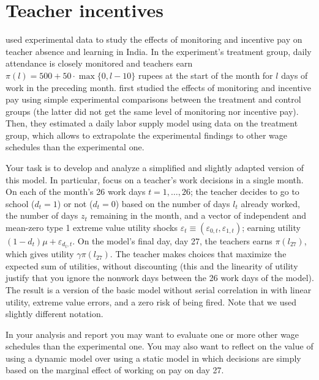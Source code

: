 \documentclass[fleqn,12pt]{article}
\theoremstyle{plain}
\theoremstyle{definition}
\begin{document}
\section*{Teacher incentives}

\citet{aer12:dufloetal} used experimental data to study the effects of monitoring and incentive pay on teacher absence and learning in India. In the experiment's treatment group, daily attendance is closely monitored and teachers earn $\pi(l)=500+50\cdot\max\{0,l-10\}$ rupees at the start of the month for $l$ days of work in the preceding month. \citeauthor{aer12:dufloetal} first studied the effects of monitoring and incentive pay using simple experimental comparisons between the treatment and control groups (the latter did not get the same level of monitoring nor incentive pay). Then, they estimated a daily labor supply model using data on the treatment group, which allows to extrapolate the experimental findings to other wage schedules than the experimental one. 

Your task is to develop and analyze a simplified and slightly adapted version of this model. In particular, focus on a teacher's work decisions in a single month. On each of the month's 26 work days $t=1,\ldots,26$; the teacher decides to go to school ($d_t=1$) or not ($d_t=0$) based on the number of days $l_t$ already worked, the number of days $z_t$ remaining in the month, and a vector of independent and mean-zero type 1 extreme value utility shocks $\varepsilon_t\equiv(\varepsilon_{0,t},\varepsilon_{1,t})$; earning utility $(1-d_t)\mu+\varepsilon_{d_t,t}$. On the model's final day, day 27, the teachers earns $\pi(l_{27})$, which gives utility $\gamma\pi(l_{27})$.  The teacher makes choices that maximize the expected sum of utilities, without discounting (this and the linearity of utility justify that you ignore the nonwork days between the 26 work days of the model). The result is a version of the basic model without serial correlation in \citet[][Section III]{aer12:dufloetal} with linear utility, extreme value errors, and a zero risk of being fired. Note that we used slightly different notation.

In your analysis and report you may want to evaluate one or more other wage schedules than the experimental one. You may also want to reflect on the value of using a dynamic model over  using a static model in which decisions are simply based on the marginal effect of working on pay on day 27. 



\end{document}
